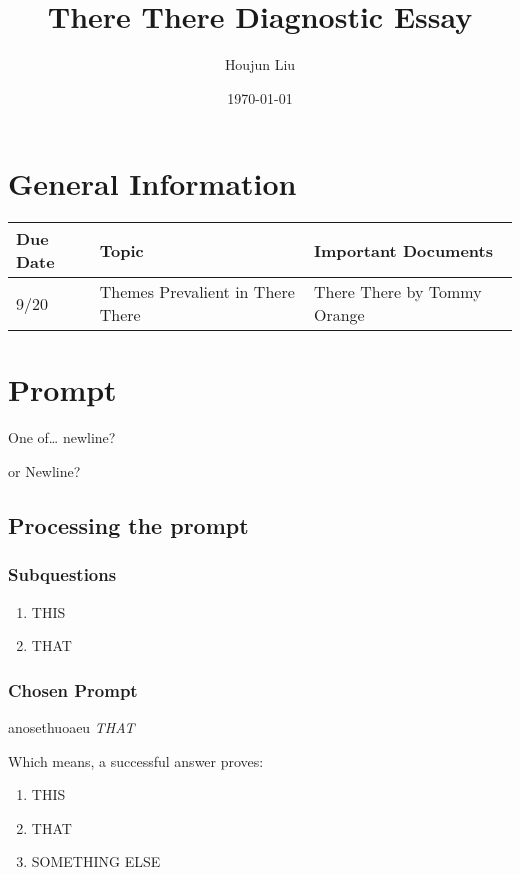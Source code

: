 \documentclass[11pt]{article}
\author{Houjun Liu}
\date{\today}
\title{There There Diagnostic Essay}
\begin{document}
\maketitle
\tableofcontents


\section{General Information}
\label{sec:org710c45e}
\begin{center}
\begin{tabular}{lll}
Due Date & Topic & Important Documents\\
\hline
9/20 & Themes Prevalient in There There & There There by Tommy Orange\\
\end{tabular}
\end{center}

\section{Prompt}
\label{sec:org16f5fed}
One of\ldots{}
newline?

or Newline?

\subsection{Processing the prompt}
\label{sec:org02bb8d4}

\subsubsection{Subquestions}
\label{sec:orgc9d32af}
\begin{enumerate}
\item THIS
\item THAT
\end{enumerate}

\subsubsection{Chosen Prompt}
\label{sec:orga4c7bfd}
anosethuoaeu
\emph{THAT}

Which means, a successful answer proves:

\begin{enumerate}
\item THIS
\item THAT
\item SOMETHING ELSE
\end{enumerate}
\end{document}
